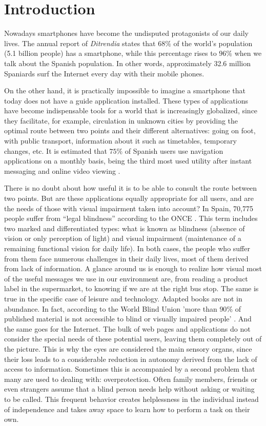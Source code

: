 \chapter{Introduction}
\label{cap:introduction}

Nowadays smartphones have become the undisputed protagonists of our daily lives. The annual report of \textit{Ditrendia} \citep{ditrendia2019report} states that $68\%$ of the world's population (5.1 billion people) has a smartphone, while this percentage rises to $96\%$ when we talk about the Spanish population. In other words, approximately 32.6 million Spaniards surf the Internet every day with their mobile phones. 

On the other hand, it is practically impossible to imagine a smartphone that today does not have a guide application installed. These types of applications have become indispensable tools for a world that is increasingly globalized, since they facilitate, for example, circulation in unknown cities by providing the optimal route between two points and their different alternatives: going on foot, with public transport, information about it such as timetables, temporary changes, etc. It is estimated that $75\%$ of Spanish users use navigation applications on a monthly basis, being the third most used utility after instant messaging and online video viewing \citep{ditrendia2019informe}.

There is no doubt about how useful it is to be able to consult the route between two points. But are these applications equally appropriate for all users, and are the needs of those with visual impairment taken into account? In Spain, 70,775 people suffer from ``legal blindness'' according to the ONCE \citep{informeceguera}. This term includes two marked and differentiated types: what is known as blindness (absence of vision or only perception of light) and visual impairment (maintenance of a remaining functional vision for daily life). In both cases, the people who suffer from them face numerous challenges in their daily lives, most of them derived from lack of information. A glance around us is enough to realize how visual most of the useful messages we use in our environment are, from reading a product label in the supermarket, to knowing if we are at the right bus stop. The same is true in the specific case of leisure and technology. Adapted books are not in abundance. In fact, according to the World Blind Union 'more than $90\%$ of published material is not accessible to blind or visually impaired people' \citep{envision}. And the same goes for the Internet. The bulk of web pages and applications do not consider the special needs of these potential users, leaving them completely out of the picture. This is why the eyes are considered the main sensory organs, since their loss leads to a considerable reduction in autonomy derived from the lack of access to information. Sometimes this is accompanied by a second problem that many are used to dealing with: overprotection. Often family members, friends or even strangers assume that a blind person needs help without asking or waiting to be called. This frequent behavior creates helplessness in the individual instead of independence and takes away space to learn how to perform a task on their own. 

